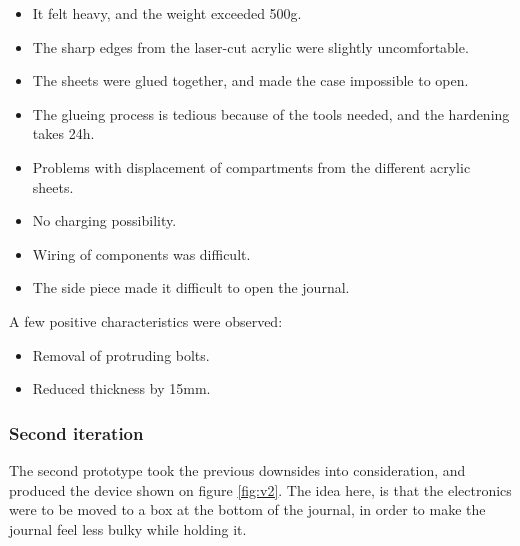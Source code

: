 \begin{itemize} \itemsep0em
  \item It felt heavy, and the weight exceeded 500g.
  \item The sharp edges from the laser-cut acrylic were slightly uncomfortable.
  \item The sheets were glued together, and made the case impossible to open.
  \item The glueing process is tedious because of the tools needed, and the hardening takes 24h.
  \item Problems with displacement of compartments from the different acrylic sheets.
  \item No charging possibility.
  \item Wiring of components was difficult.
  \item The side piece made it difficult to open the journal.
\end{itemize}

A few positive characteristics were observed:
\begin{itemize} \itemsep0em
  \item Removal of protruding bolts.
  \item Reduced thickness by 15mm.
\end{itemize}


\subsubsection{Second iteration}
The second prototype took the previous downsides into consideration, and produced the device shown on figure \ref{fig:v2}. The idea here, is that the electronics were to be moved to a box at the bottom of the journal, in order to make the journal feel less bulky while holding it.

